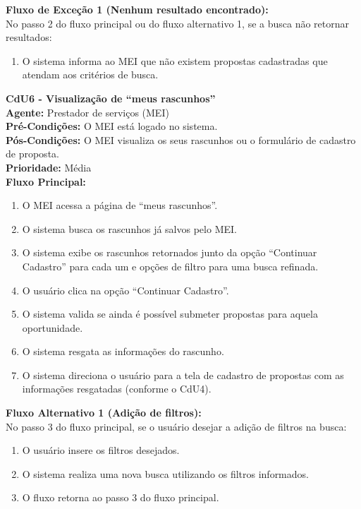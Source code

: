 \noindent\textbf{Fluxo de Exceção 1 (Nenhum resultado encontrado):}\\
No passo 2 do fluxo principal ou do fluxo alternativo 1, se a busca não retornar resultados:
\begin{enumerate}[noitemsep, topsep=-5pt, parsep=0pt]
    \item O sistema informa ao MEI que não existem propostas cadastradas que atendam aos critérios de busca.
\end{enumerate}


\vspace{7pt}
\noindent\textbf{\normalsize CdU6 - Visualização de ``meus rascunhos''}\\
\noindent\textbf{Agente:} Prestador de serviços (MEI)\\ 
\textbf{Pré-Condições:} O MEI está logado no sistema.\\ 
\textbf{Pós-Condições:} O MEI visualiza os seus rascunhos ou o formulário de cadastro de proposta.\\
\textbf{Prioridade:} Média \vspace{3pt}\\
\noindent\textbf{Fluxo Principal:}
\begin{enumerate}[noitemsep, topsep=-5pt, parsep=0pt]
    \item O MEI acessa a página de ``meus rascunhos''.
    \item O sistema busca os rascunhos já salvos pelo MEI.
    \item O sistema exibe os rascunhos retornados junto da opção ``Continuar Cadastro'' para cada um e opções de filtro para uma busca refinada.
    \item O usuário clica na opção ``Continuar Cadastro''.
    \item O sistema valida se ainda é possível submeter propostas para aquela oportunidade.
    \item O sistema resgata as informações do rascunho.
    \item O sistema direciona o usuário para a tela de cadastro de propostas com as informações resgatadas (conforme o CdU4).
\end{enumerate}

\noindent\textbf{Fluxo Alternativo 1 (Adição de filtros):}\\
No passo 3 do fluxo principal, se o usuário desejar a adição de filtros na busca:
\begin{enumerate}[noitemsep, topsep=-5pt, parsep=0pt]
    \item O usuário insere os filtros desejados.
    \item O sistema realiza uma nova busca utilizando os filtros informados.
    \item O fluxo retorna ao passo 3 do fluxo principal.
\end{enumerate}

